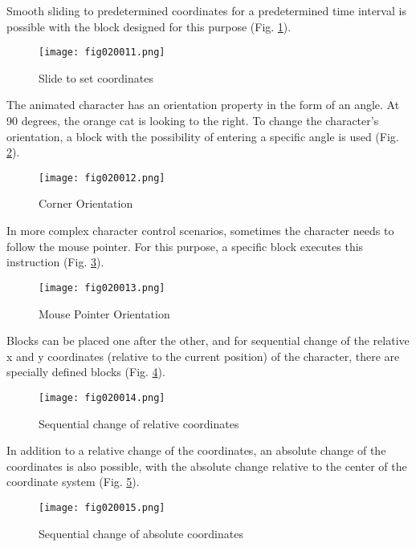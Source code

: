 Smooth sliding to predetermined coordinates for a predetermined time interval is possible with the block designed for this purpose (Fig. \ref{fig020011}).

\begin{figure}[H]
   \centering
   \texttt{[image: fig020011.png]}
   \caption{Slide to set coordinates}
\label{fig020011}
\end{figure}

The animated character has an orientation property in the form of an angle. At 90 degrees, the orange cat is looking to the right. To change the character's orientation, a block with the possibility of entering a specific angle is used (Fig. \ref{fig020012}).

\begin{figure}[H]
   \centering
   \texttt{[image: fig020012.png]}
   \caption{Corner Orientation}
\label{fig020012}
\end{figure}

In more complex character control scenarios, sometimes the character needs to follow the mouse pointer. For this purpose, a specific block executes this instruction (Fig. \ref{fig020013}).

\begin{figure}[H]
   \centering
   \texttt{[image: fig020013.png]}
   \caption{Mouse Pointer Orientation}
\label{fig020013}
\end{figure}

Blocks can be placed one after the other, and for sequential change of the relative x and y coordinates (relative to the current position) of the character, there are specially defined blocks (Fig. \ref{fig020014}).

\begin{figure}[H]
   \centering
   \texttt{[image: fig020014.png]}
   \caption{Sequential change of relative coordinates}
\label{fig020014}
\end{figure}

In addition to a relative change of the coordinates, an absolute change of the coordinates is also possible, with the absolute change relative to the center of the coordinate system (Fig. \ref{fig020015}).

\begin{figure}[H]
   \centering
   \texttt{[image: fig020015.png]}
   \caption{Sequential change of absolute coordinates}
\label{fig020015}
\end{figure}

